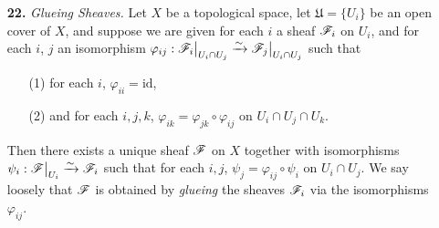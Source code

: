 \documentclass{article}
\begin{document}
\begin{enumerate} [label=\textbf{\arabic*.}, leftmargin=0em]
\begin{proof}
\begin{align*}
        & = (\alpha(U) \circ (f^{-1}f_*\varphi)(U))((W, t))) \\
        & = \alpha(U)((f^{-1}(W), \varphi(f^{-1}(W)(t)))) \\
        & = \restr{\varphi(f^{-1}(W)((W, t)))}{U} \\
        & = \varphi(U)((W, t)).
    \end{align*}
    Here, we used the fact that the restriction map commutes with $\varphi(U)$ by definition of morphisms between sheaves. Let $t \in \Gamma(V, \fG)$. We similarly have
    \begin{align*}
        (\beta*\alpha^*\psi)(V)(t) & = ((f_*\alpha)(V) \circ (f_*f^{-1}\psi)(V) \circ \beta(V))(t) \\
        & = ((f_*\alpha)(V) \circ (f_*f^{-1}\psi(V)))((V, t)) \\
        & = (f_*\alpha)(V)(\psi(V)(t)) \\
        & = \psi(V)(t).
    \end{align*}
    Hence, $\alpha*$ and $\beta^*$ are bijections with inverses to each other.
\end{proof}

\item[\textbf{22.}] \textit{Glueing Sheaves.} Let $X$ be a topological space, let $\mathfrak{U} = \{ U_i \}$ be an open cover of $X$, and suppose we are given for each $i$ a sheaf $\mathscr{F}_i$ on $U_i$, and for each $i$, $j$ an isomorphism $\varphi_{ij} : \restr{\fF_i}{U_i \cap U_j} \xrightarrow{\sim} \restr{\fF_j}{U_i \cap U_j}$ such that
\begin{itemize}
    \item[(1)] for each $i$, $\varphi_{ii} = \text{id}$,
    \item[(2)] and for each $i, j, k$, $\varphi_{ik} = \varphi_{jk} \circ \varphi_{ij}$ on $U_i \cap U_j \cap U_k$.
\end{itemize}
Then there exists a unique sheaf $\mathscr{F}$ on $X$ together with isomorphisms $\psi_i : \restr{\fF}{U_i} \xrightarrow{\sim} \fF_i$ such that for each $i, j$, $\psi_j = \varphi_{ij} \circ \psi_i$ on $U_i \cap U_j$. We say loosely that $\mathscr{F}$ is obtained by \textit{glueing} the sheaves $\mathscr{F}_i$ via the isomorphisms $\varphi_{ij}$.

\end{enumerate}
\end{document}
